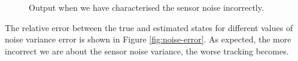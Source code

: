 \begin{figure}[h]
\centering
{}
\caption{Output when we have characterised the sensor noise incorrectly.}
\label{fig:filter-bad}
\end{figure}

The relative error between the true and estimated states for different values
of noise variance error is shown in Figure \ref{fig:noise-error}. As expected,
the more incorrect we are about the sensor noise variance, the worse tracking
becomes.

